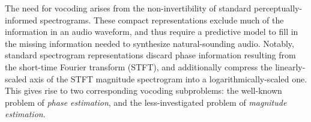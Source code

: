 \documentclass[a4paper]{article}
\begin{document}



The need for vocoding arises from the non-invertibility of standard perceptually-informed spectrograms. 
These compact representations
exclude much of the information in an audio waveform, 
and thus require a predictive model to fill in the missing information needed to synthesize natural-sounding audio. 
Notably, standard spectrogram representations discard phase information resulting from the short-time Fourier transform (STFT), 
and additionally compress the linearly-scaled axis of the STFT magnitude spectrogram into a logarithmically-scaled one. 
This gives rise to two corresponding vocoding subproblems: 
the well-known problem of \emph{phase estimation}, 
and the less-investigated problem of \emph{magnitude estimation}. 
\end{document}
